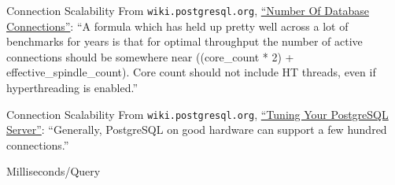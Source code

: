 \documentclass[14pt]{beamer}
\begin{document}
\begin{frame}{Connection Scalability}
  From \texttt{wiki.postgresql.org},
  \href{https://wiki.postgresql.org/wiki/Number_Of_Database_Connections}{``Number
    Of Database Connections''}:
  \newline
  \newline
  ``A formula which has held up pretty well across a lot of benchmarks for years
  is that for optimal throughput the number of active connections should be
  somewhere near ((core\_count * 2) + effective\_spindle\_count). Core count
  should not include HT threads, even if hyperthreading is enabled.''

\end{frame}

\begin{frame}{Connection Scalability}
  From \texttt{wiki.postgresql.org},
  \href{https://wiki.postgresql.org/wiki/Tuning_Your_PostgreSQL_Server}{``Tuning
    Your PostgreSQL Server''}:
  \newline
  \newline
  ``Generally, PostgreSQL on good hardware can support a few hundred connections.''
\end{frame}

\begin{frame}{Milliseconds/Query}
\end{frame}
\end{document}
